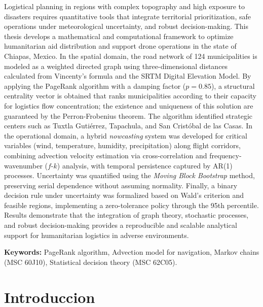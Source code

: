 \documentclass[
  spanish,
  us-letterpaper,
]{scrreprt}
\numberwithin{equation}{section}
\begin{document}
Logistical planning in regions with complex topography and high exposure
to disasters requires quantitative tools that integrate territorial
prioritization, safe operations under meteorological uncertainty, and
robust decision-making. This thesis develops a mathematical and
computational framework to optimize humanitarian aid distribution and
support drone operations in the state of Chiapas, Mexico. In the spatial
domain, the road network of 124 municipalities is modeled as a weighted
directed graph using three-dimensional distances calculated from
Vincenty's formula and the SRTM Digital Elevation Model. By applying the
PageRank algorithm with a damping factor (\(p=0.85\)), a structural
centrality vector is obtained that ranks municipalities according to
their capacity for logistics flow concentration; the existence and
uniqueness of this solution are guaranteed by the Perron-Frobenius
theorem. The algorithm identified strategic centers such as Tuxtla
Gutiérrez, Tapachula, and San Cristóbal de las Casas. In the operational
domain, a hybrid \emph{nowcasting} system was developed for critical
variables (wind, temperature, humidity, precipitation) along flight
corridors, combining advection velocity estimation via cross-correlation
and frequency-wavenumber (\(f\)-\(k\)) analysis, with temporal
persistence captured by AR(1) processes. Uncertainty was quantified
using the \emph{Moving Block Bootstrap} method, preserving serial
dependence without assuming normality. Finally, a binary decision rule
under uncertainty was formalized based on Wald's criterion and feasible
regions, implementing a zero-tolerance policy through the 95th
percentile. Results demonstrate that the integration of graph theory,
stochastic processes, and robust decision-making provides a reproducible
and scalable analytical support for humanitarian logistics in adverse
environments.

\textbf{Keywords:} PageRank algorithm, Advection model for navigation,
Markov chains (MSC 60J10), Statistical decision theory (MSC 62C05).


\chapter{Introduccion}\label{introduccion}
\end{document}
